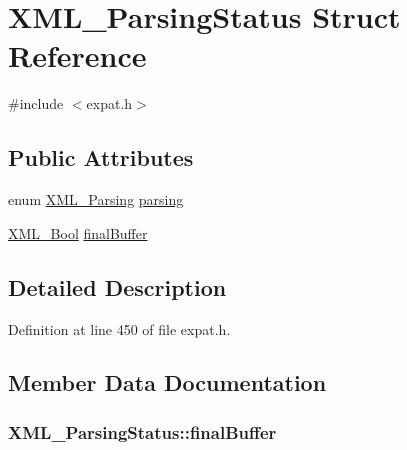\hypertarget{struct_x_m_l___parsing_status}{}\section{X\+M\+L\+\_\+\+Parsing\+Status Struct Reference}
\label{struct_x_m_l___parsing_status}


{\ttfamily \#include $<$expat.\+h$>$}

\subsection*{Public Attributes}
\begin{DoxyCompactItemize}
\item 
enum \hyperlink{amiga_2include_2libraries_2expat_8h_a1e8b2aa21ec26bcf0eb696197b53aab6}{X\+M\+L\+\_\+\+Parsing} \hyperlink{struct_x_m_l___parsing_status_af7f58f4731cf34a10da39dd7b9cfb82b}{parsing}
\item 
\hyperlink{amiga_2include_2libraries_2expat_8h_a5fe41bca8b7a23b2405f1b967e70f33a}{X\+M\+L\+\_\+\+Bool} \hyperlink{struct_x_m_l___parsing_status_ac9f1a8f3a0f2f0e886760756c0022880}{final\+Buffer}
\end{DoxyCompactItemize}


\subsection{Detailed Description}


Definition at line 450 of file expat.\+h.



\subsection{Member Data Documentation}
\subsubsection[{\texorpdfstring{final\+Buffer}{finalBuffer}}]{ X\+M\+L\+\_\+\+Parsing\+Status\+::final\+Buffer}\hypertarget{struct_x_m_l___parsing_status_ac9f1a8f3a0f2f0e886760756c0022880}{}\label{struct_x_m_l___parsing_status_ac9f1a8f3a0f2f0e886760756c0022880}


